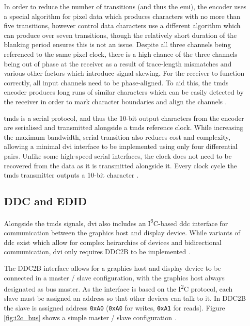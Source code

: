 In order to reduce the number of transitions (and thus the \gls{emi}), the encoder uses a special algorithm for pixel data which produces characters with no more than five transitions, however control data characters use a different algorithm which can produce over seven transitions, though the relatively short duration of the blanking period ensures this is not an issue. Despite all three channels being referenced to the same pixel clock, there is a high chance of the three channels being out of phase at the receiver as a result of trace-length mismatches and various other factors which introduce signal skewing. For the receiver to function correctly, all input channels need to be phase-aligned. To aid this, the \gls{tmds} encoder produces long runs of similar characters which can be easily detected by the receiver in order to mark character boundaries and align the channels \cite{dvi_spec}.

\gls{tmds} is a serial protocol, and thus the 10-bit output characters from the encoder are serialised and transmitted alongside a \gls{tmds} reference clock. While increasing the maximum bandwidth, serial transition also reduces cost and complexity, allowing a minimal \gls{dvi} interface to be implemented using only four differential pairs. Unlike some high-speed serial interfaces, the clock does not need to be recovered from the data as it is transmitted alongside it. Every clock cycle the \gls{tmds} transmitter outputs a 10-bit character \cite{dvi_spec}.

\subsection{DDC and EDID}

Alongside the \gls{tmds} signals, \gls{dvi} also includes an I\textsuperscript{2}C-based \gls{ddc} interface for communication between the graphics host and display device. While variants of \gls{ddc} exist which allow for complex heirarchies of devices and bidirectional communication, \gls{dvi} only requires DDC2B to be implemented \cite{dvi_spec}.

The DDC2B interface allows for a graphics host and display device to be connected in a master / slave configuration, with the graphics host always designated as bus master. As the interface is based on the I\textsuperscript{2}C protocol, each slave must be assigned an address so that other devices can talk to it. In DDC2B the slave is assigned address \texttt{0xA0} (\texttt{0xA0} for writes, \texttt{0xA1} for reads). Figure \ref{fig:i2c_bus} shows a simple master / slave configuration \cite{dvi_spec}.

